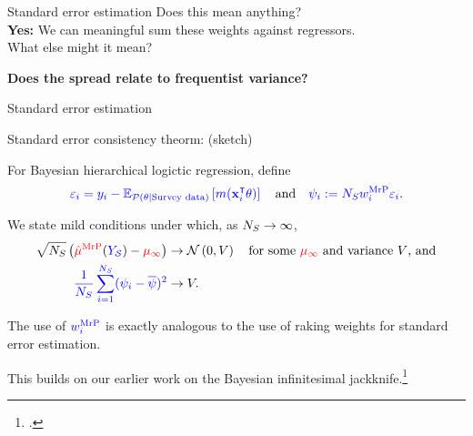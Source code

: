 




\begin{frame}[c]{Standard error estimation}
\centering
{
Does this mean anything?  \\
\textbf{Yes: }We can meaningful sum these weights against regressors.\\[1em]
What else might it mean?\\
}

{
\textbf{Does the spread relate to frequentist variance?}
}

\splitpagenoline{
    \AlexanderWeightPlot{}
}{
    \LaxWeightPlot{}
}
\end{frame}




\begin{frame}[c]{Standard error estimation}



\begin{block}{Standard error consistency theorm: (sketch)}

For Bayesian hierarchical logictic regression, define
$$
\textcolor{blue}{\varepsilon_i = y_i - \mathbb{E}_{\textcolor{blue}{\mathcal{P}(\theta \vert \textrm{Survey data})}}\left[ m(\mathbf{x}_i^\intercal \theta)\right]\,}
\quad\textrm{and}\quad
\textcolor{blue}{\psi_i := {N_S} w_i^{\mathrm{MrP}} \varepsilon_i}.
$$

We state mild conditions under which, as ${N_S} \rightarrow \infty$,
$$
\begin{aligned}
    \sqrt{{N_S}}\left(\textcolor{red}{\hat{\mu}^{\mathrm{MrP}}}(\textcolor{blue}{\textcolor{blue}{Y_{\mathcal{S}}}}) - \textcolor{red}{\mu_\infty} \right) \rightarrow{}&
    \mathcal{N}\left(0, V\right) \quad\textrm{for some $\textcolor{red}{\mu_\infty}$ and variance $V$, and}\\
\textcolor{blue}{\frac{1}{{N_S}} \sum_{i=1}^{N_S} (\psi_i - \overline{\psi})^2} \rightarrow{}& V.
\end{aligned}
$$
\end{block}

The use of $\textcolor{blue}{w_i^{\mathrm{MrP}}}$ is exactly analogous to the use of raking weights
for standard error estimation.

This builds on our earlier work on the Bayesian
infinitesimal jackknife.\footcite{giordano:2024:bayesij}

\end{frame}

